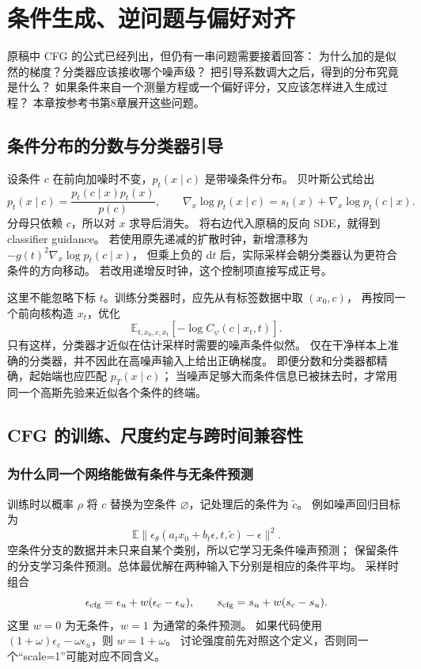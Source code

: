 \chapter{条件生成、逆问题与偏好对齐}
\label{supp:guidance}

原稿中 CFG 的公式已经列出，但仍有一串问题需要接着回答：
为什么加的是似然的梯度？分类器应该接收哪个噪声级？
把引导系数调大之后，得到的分布究竟是什么？
如果条件来自一个测量方程或一个偏好评分，又应该怎样进入生成过程？
本章按参考书第8章展开这些问题。\cite{theorybook}

\section{条件分布的分数与分类器引导}
设条件 $c$ 在前向加噪时不变，$p_t(x\mid c)$ 是带噪条件分布。
贝叶斯公式给出
\[
p_t(x\mid c)=\frac{p_t(c\mid x)p_t(x)}{p(c)},\qquad
\nabla_x\log p_t(x\mid c)=s_t(x)+\nabla_x\log p_t(c\mid x).
\]
分母只依赖 $c$，所以对 $x$ 求导后消失。
将右边代入原稿的反向 SDE，就得到 classifier guidance。
若使用原先递减的扩散时钟，新增漂移为
$-g(t)^2\nabla_x\log p_t(c\mid x)$，
但乘上负的 $\mathrm dt$ 后，实际采样会朝分类器认为更符合条件的方向移动。
若改用递增反时钟，这个控制项直接写成正号。

这里不能忽略下标 $t$。训练分类器时，应先从有标签数据中取 $(x_0,c)$，
再按同一个前向核构造 $x_t$，优化
\[
\mathbb E_{t,x_0,c,x_t}[-\log C_\psi(c\mid x_t,t)].
\]
只有这样，分类器才近似在估计采样时需要的噪声条件似然。
仅在干净样本上准确的分类器，并不因此在高噪声输入上给出正确梯度。
即便分数和分类器都精确，起始端也应匹配 $p_T(x\mid c)$；
当噪声足够大而条件信息已被抹去时，才常用同一个高斯先验来近似各个条件的终端。

\section{CFG 的训练、尺度约定与跨时间兼容性}
\subsection{为什么同一个网络能做有条件与无条件预测}
训练时以概率 $\rho$ 将 $c$ 替换为空条件 $\varnothing$，记处理后的条件为 $\tilde c$。
例如噪声回归目标为
\[
\mathbb E\|\epsilon_\theta(a_tx_0+b_t\epsilon,t,\tilde c)-\epsilon\|^2.
\]
空条件分支的数据并未只来自某个类别，所以它学习无条件噪声预测；
保留条件的分支学习条件预测。总体最优解在两种输入下分别是相应的条件平均。
采样时组合
\[
\epsilon_{\rm cfg}=\epsilon_u+w(\epsilon_c-\epsilon_u),\qquad
s_{\rm cfg}=s_u+w(s_c-s_u).
\]
这里 $w=0$ 为无条件，$w=1$ 为通常的条件预测。
如果代码使用 $(1+\omega)\epsilon_c-\omega\epsilon_u$，则 $w=1+\omega$。
讨论强度前先对照这个定义，否则同一个“scale=1”可能对应不同含义。

